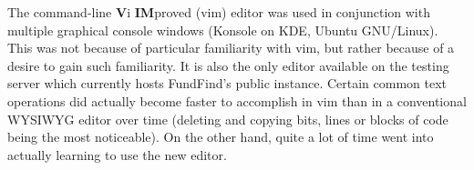 The command-line \textbf{V}i \textbf{IM}proved (vim) editor was used in conjunction with multiple graphical console windows (Konsole on KDE, Ubuntu GNU/Linux). This was not because of particular familiarity with vim, but rather because of a desire to gain such familiarity. It is also the only editor available on the testing server which currently hosts FundFind's public instance. Certain common text operations did actually become faster to accomplish in vim than in a conventional WYSIWYG editor over time (deleting and copying bits, lines or blocks of code being the most noticeable). On the other hand, quite a lot of time went into actually learning to use the new editor.

